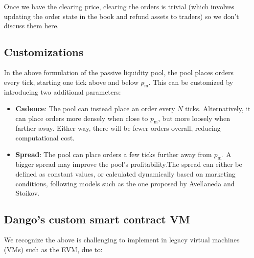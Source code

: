 \documentclass{article}
\begin{document}
Once we have the clearing price, clearing the orders is trivial (which involves updating the order state in the book and refund assets to traders) so we don't discuss them here.

\subsection{Customizations}

In the above formulation of the passive liquidity pool, the pool places orders every tick, starting one tick above and below $p_{\mathrm{m}}$. This can be customized by introducing two additional parameters:

\begin{itemize}
  \item \textbf{Cadence}: The pool can instead place an order every $N$ ticks. Alternatively, it can place orders more densely when close to $p_{\mathrm{m}}$, but more loosely when farther away. Either way, there will be fewer orders overall, reducing computational cost.
  \item \textbf{Spread}: The pool can place orders a few ticks further away from $p_{\mathrm{m}}$. A bigger spread may improve the pool's profitability.The spread can either be defined as constant values, or calculated dynamically based on marketing conditions, following models such as the one proposed by Avellaneda and Stoikov.\supercite{avellanedastoikov}
\end{itemize}

\subsection{Dango's custom smart contract VM}

We recognize the above is challenging to implement in legacy virtual machines (VMs) such as the EVM, due to:
\end{document}
